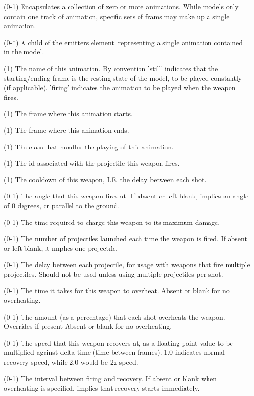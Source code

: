\begin{description}
\item {} (0-1)  Encapsulates a collection of zero or more animations.  While models only contain one track of animation, specific sets of frams may make up a single animation.
\item {} (0-*)  A child of the emitters element, representing a single animation contained in the model.
\item {} (1)  The name of this animation.  By convention 'still' indicates that the starting/ending frame is the resting state of the model, to be played constantly (if applicable).  'firing' indicates the animation to be played when the weapon fires.
\item {} (1)  The frame where this animation starts.
\item {} (1)  The frame where this animation ends.
\item {} (1)  The class that handles the playing of this animation.  

\item {} (1)  The id associated with the projectile this weapon fires.
\item {} (1)  The cooldown of this weapon, I.E. the delay between each shot.
\item {} (0-1)  The angle that this weapon fires at.  If absent or left blank, implies an angle of 0 degrees, or parallel to the ground.
\item {} (0-1)  The time required to charge this weapon to its maximum damage.
\item {} (0-1)  The number of projectiles launched each time the weapon is fired.  If absent or left blank, it implies one projectile.
\item {} (0-1)  The delay between each projectile, for usage with weapons that fire multiple projectiles.  Should not be used unless using multiple projectiles per shot.
\item {} (0-1)  The time it takes for this weapon to overheat.  Absent or blank for no overheating.
\item {} (0-1) The amount (as a percentage) that each shot overheats the weapon.  Overrides  if present  Absent or blank for no overheating.  
\item {} (0-1) The speed that this weapon recovers at, as a floating point value to be multiplied against delta time (time between frames).  1.0 indicates normal recovery speed, while 2.0 would be 2x speed.
\item {} (0-1)  The interval between firing and recovery.  If absent or blank when overheating is specified, implies that recovery starts immediately.
\end{description}

